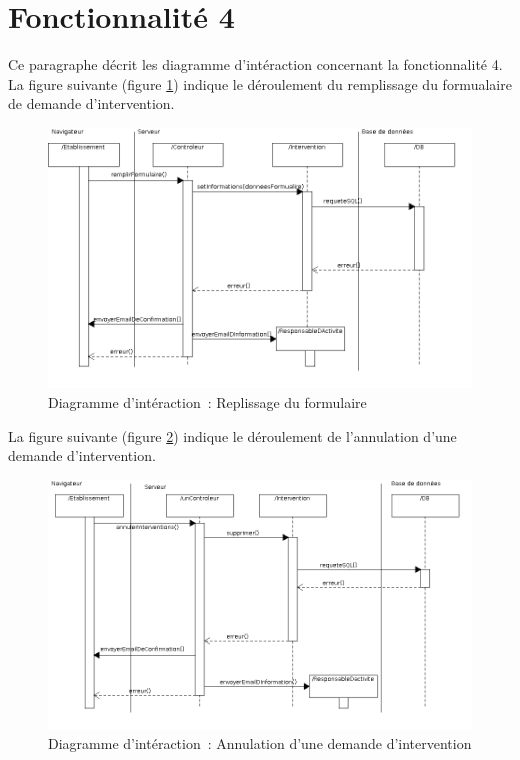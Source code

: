 \section{Fonctionnalité 4}
Ce paragraphe décrit les diagramme d'intéraction concernant la fonctionnalité 4. \\

La figure suivante (figure \ref{diagrammeInteraction5}) indique le déroulement du remplissage du formualaire de demande d'intervention.
\begin{figure}[H]
	\centering
	\includegraphics[scale=0.5]{images/diagrammesInteraction/05_diagrammeInteractionF4.png}
	\caption{Diagramme d'intéraction~: Replissage du formulaire}
	\label{diagrammeInteraction5}
\end{figure}


La figure suivante (figure \ref{diagrammeInteraction6}) indique le déroulement de l'annulation d'une demande d'intervention.
\begin{figure}[h]
	\centering
	\includegraphics[scale=0.5]{images/diagrammesInteraction/06_diagrammeInteractionF4.png}
	\caption{Diagramme d'intéraction~: Annulation d'une demande d'intervention}
	\label{diagrammeInteraction6}
\end{figure}

